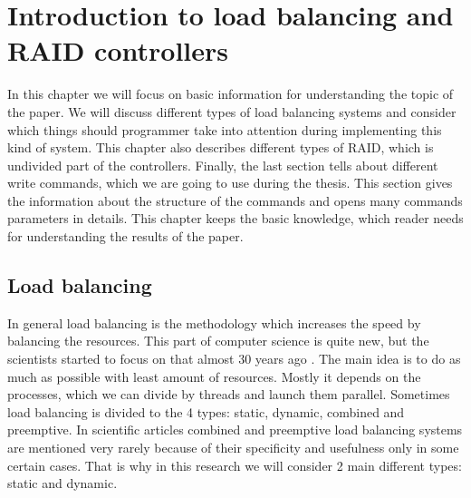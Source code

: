 \chapter{Introduction to load balancing and RAID controllers}
\label{chap2:title}

In this chapter we will focus on basic information for understanding the topic of the paper. We will discuss different types of load balancing systems and consider which things should programmer take into attention during implementing this kind of system. This chapter also describes different types of RAID, which is undivided part of the controllers. Finally, the last section tells about different write commands, which we are going to use during the thesis. This section gives the information about the structure of the commands and opens many commands parameters in details. This chapter keeps the basic knowledge, which reader needs for understanding the results of the paper.

\newpage
\section{Load balancing}
In general load balancing is the methodology which increases the speed by balancing the resources. This part of computer science is quite new, but the scientists started to focus on that almost 30 years ago \cite{stat_load_bal_1985}. The main idea is to do as much as possible with least amount of resources. Mostly it depends on the processes, which we can divide by threads and launch them parallel. Sometimes load balancing is divided to the 4 types: static, dynamic, combined and preemptive. In scientific articles combined and preemptive load balancing systems are mentioned very rarely because of their specificity and usefulness only in some certain cases. That is why in this research we will consider 2 main different types: static and dynamic.

